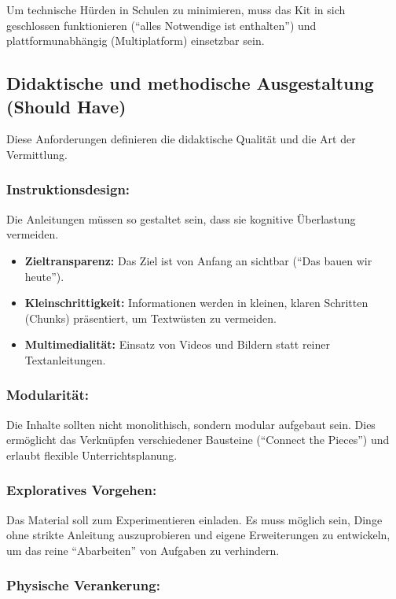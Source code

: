 \documentclass[a5paper,pagesize,10pt,bibtotoc,pointlessnumbers,
normalheadings,DIV=9,twoside=false]{scrbook}
\begin{document}
Um technische Hürden in Schulen zu minimieren, muss das Kit in sich geschlossen funktionieren (``alles Notwendige ist enthalten'') und plattformunabhängig (Multiplatform) einsetzbar sein.

\subsection*{Didaktische und methodische Ausgestaltung (Should Have)}

Diese Anforderungen definieren die didaktische Qualität und die Art der Vermittlung.

\subsubsection{Instruktionsdesign:}
    
Die Anleitungen müssen so gestaltet sein, dass sie kognitive Überlastung vermeiden.

\begin{itemize}
    \item \textbf{Zieltransparenz:} Das Ziel ist von Anfang an sichtbar (``Das bauen wir heute'').
    \item \textbf{Kleinschrittigkeit:} Informationen werden in kleinen, klaren Schritten (Chunks) präsentiert, um Textwüsten zu vermeiden.
    \item \textbf{Multimedialität:} Einsatz von Videos und Bildern statt reiner Textanleitungen.
\end{itemize}

\subsubsection{Modularität:}
    
Die Inhalte sollten nicht monolithisch, sondern modular aufgebaut sein. Dies ermöglicht das Verknüpfen verschiedener Bausteine (``Connect the Pieces'') und erlaubt flexible Unterrichtsplanung.
    
\subsubsection{Exploratives Vorgehen:}
    
Das Material soll zum Experimentieren einladen. Es muss möglich sein, Dinge ohne strikte Anleitung auszuprobieren und eigene Erweiterungen zu entwickeln, um das reine ``Abarbeiten'' von Aufgaben zu verhindern.
    
\subsubsection{Physische Verankerung:}
    
\end{document}
